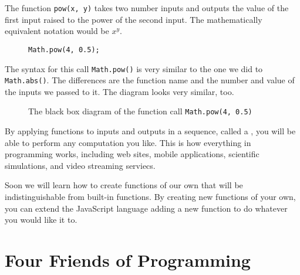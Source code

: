 \documentclass{amsart}
\makeatletter
\def\tikzscale{1}\begin{lrbox}{\measure@tikzpicture}%
\edef\tikzscale{\pgfmathresult}%
\makeatother
\begin{document}
The function \texttt{pow(x, y)} takes two number inputs and outputs the value of the first input raised to the power of the second input. The mathematically equivalent notation would be $x^y$.

\begin{figure}[h]
\begin{lstlisting}
Math.pow(4, 0.5);
\end{lstlisting}
\end{figure}

The syntax for this call \texttt{Math.pow()} is very similar to the one we did to \texttt{Math.abs()}. The differences are the function name and the number and value of the inputs we passed to it. The diagram looks very similar, too.

\begin{figure}[h]
\begin{scaletikzpicturetowidth}{\textwidth}
\end{scaletikzpicturetowidth}
\caption{The black box diagram of the function call \texttt{Math.pow(4, 0.5)}}
\end{figure}

By applying functions to inputs and outputs in a sequence, called a , you will be able to perform any computation you like. This is how everything in programming works, including web sites, mobile applications, scientific simulations, and video streaming serviecs.

Soon we will learn how to create functions of our own that will be indistinguishable from built-in functions. By creating new functions of your own, you can extend the JavaScript language adding a new function to do whatever you would like it to.

\section{Four Friends of Programming}
\end{document}
